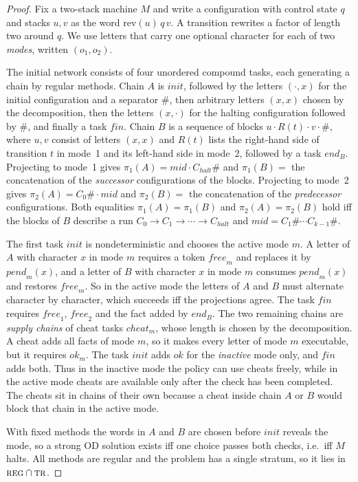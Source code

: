 \begin{proof}
  Fix a two-stack machine $M$ and write a configuration with control state $q$ and stacks $u,v$
  as the word $\mathrm{rev}(u)\,q\,v$. A transition rewrites a factor of length two around $q$.
  We use letters that carry one optional character for each of two \emph{modes},
  written $(o_1,o_2)$.

  The initial network consists of four unordered compound tasks, each generating a chain by regular
  methods. Chain $A$ is $\mathit{init}$, followed by the letters $(\cdot,x)$ for the initial
  configuration and a separator $\#$, then arbitrary letters $(x,x)$ chosen by the decomposition,
  then the letters $(x,\cdot)$ for the halting configuration followed by $\#$, and finally a task
  $\mathit{fin}$. Chain $B$ is a sequence of blocks $u\cdot R(t)\cdot v\cdot\#$, where $u,v$ consist
  of letters $(x,x)$ and $R(t)$ lists the right-hand side of transition $t$ in mode~1 and its
  left-hand side in mode~2, followed by a task $\mathit{end}_B$. Projecting to mode~1 gives
  $\pi_1(A)=\mathit{mid}\cdot C_{\mathit{halt}}\#$ and $\pi_1(B)=$ the concatenation of the
  \emph{successor} configurations of the blocks. Projecting to mode~2 gives $\pi_2(A)=C_0\#\cdot
  \mathit{mid}$ and $\pi_2(B)=$ the concatenation of the \emph{predecessor} configurations.
  Both equalities $\pi_1(A)=\pi_1(B)$ and $\pi_2(A)=\pi_2(B)$ hold iff the blocks of $B$ describe a
  run $C_0\to C_1\to\cdots\to C_{\mathit{halt}}$ and $\mathit{mid}=C_1\#\cdots C_{k-1}\#$.

  The first task $\mathit{init}$ is nondeterministic and chooses the active mode $m$. A letter of
  $A$ with character $x$ in mode $m$ requires a token $\mathit{free}_m$ and replaces it by
  $\mathit{pend}_m(x)$, and a letter of $B$ with character $x$ in mode $m$ consumes
  $\mathit{pend}_m(x)$ and restores $\mathit{free}_m$. So in the active mode the letters of $A$ and
  $B$ must alternate character by character, which succeeds iff the projections agree. The task
  $\mathit{fin}$ requires $\mathit{free}_1$, $\mathit{free}_2$ and the fact added by
  $\mathit{end}_B$. The two remaining chains are \emph{supply chains} of cheat tasks
  $\mathit{cheat}_m$, whose length is chosen by the decomposition. A cheat adds all facts of mode
  $m$, so it makes every letter of mode $m$ executable, but it requires $\mathit{ok}_m$. The task
  $\mathit{init}$ adds $\mathit{ok}$ for the \emph{inactive} mode only, and $\mathit{fin}$ adds both.
  Thus in the inactive mode the policy can use cheats freely, while in the active mode cheats are
  available only after the check has been completed. The cheats sit in chains of their own
  because a cheat inside chain $A$ or $B$ would block that chain in the active mode.

  With fixed methods the words in $A$ and $B$ are chosen before $\mathit{init}$ reveals the mode,
  so a strong OD solution exists iff one choice passes both checks, i.e.\ iff $M$ halts. All
  methods are regular and the problem has a single stratum, so it lies in $\textsc{reg}\cap\textsc{tr}$.
\end{proof}

